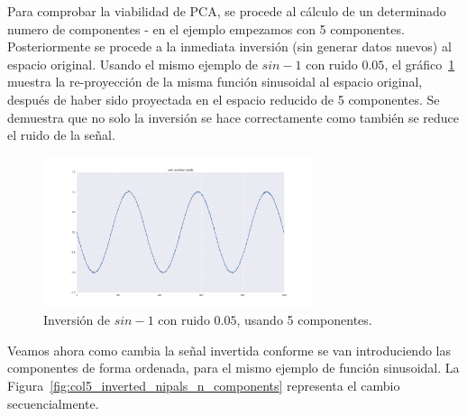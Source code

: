 \documentclass[11pt,spanish,listoffigures,listoftables]{tfgetsinf}
\begin{document}
    Para comprobar la viabilidad de PCA, se procede al cálculo de un determinado numero de componentes - en el ejemplo empezamos con 5 componentes. Posteriormente se procede a la inmediata inversión (sin generar datos nuevos) al espacio original. Usando el mismo ejemplo de \(sin - 1\) con ruido \(0.05\), el gráfico~\ref{fig:col5_inverted_nipals} muestra la re-proyección de la misma función sinusoidal al espacio original, después de haber sido proyectada en el espacio reducido de 5 componentes. Se demuestra que no solo la inversión se hace correctamente como también se reduce el ruido de la señal.

    \begin{figure}[H]
        \centering
        \includegraphics[width=0.7\textwidth]{col5_inverted_nipals.png}
        \caption{Inversión de \(sin - 1\) con ruido \(0.05\), usando 5 componentes.}
        \label{fig:col5_inverted_nipals}
    \end{figure}
    
    Veamos ahora como cambia la señal invertida conforme se van introduciendo las componentes de forma ordenada, para el mismo ejemplo de función sinusoidal. La Figura~\ref{fig:col5_inverted_nipals_n_components} representa el cambio secuencialmente. 
    
\end{document}
